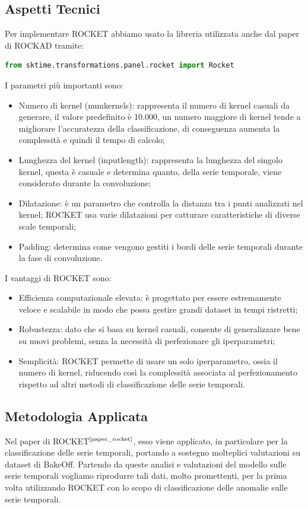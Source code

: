 \subsection{Aspetti Tecnici}
Per implementare ROCKET abbiamo usato la libreria utilizzata anche dal paper di ROCKAD tramite:
\begin{lstlisting}[language=Python]
from sktime.transformations.panel.rocket import Rocket
\end{lstlisting}
I parametri più importanti sono:
\begin{itemize}
    \item Numero di kernel (num\textunderscore kernels): rappresenta il numero di kernel casuali da generare, il valore predefinito è 10.000, un numero maggiore di kernel tende a migliorare l'accuratezza della classificazione, di conseguenza aumenta la complessità e quindi il tempo di calcolo;
    \item Lunghezza del kernel (input\textunderscore length): rappresenta la lunghezza del singolo kernel, questa è casuale e determina quanto, della serie temporale, viene considerato durante la convoluzione;
    \item Dilatazione: è un parametro che controlla la distanza tra i punti analizzati nel kernel; ROCKET usa varie dilatazioni per catturare caratteristiche di diverse scale temporali;
    \item Padding: determina come vengono gestiti i bordi delle serie temporali durante la fase di convoluzione.
\end{itemize} 

I vantaggi di ROCKET sono:
\begin{itemize}
    \item Efficienza computazionale elevata: è progettato per essere estremamente veloce e scalabile in modo che possa gestire grandi dataset in tempi ristretti;
    \item Robustezza: dato che si basa su kernel casuali, consente di generalizzare bene su nuovi problemi, senza la necessità di perfezionare gli iperparametri;
    \item Semplicità: ROCKET permette di usare un solo iperparametro, ossia il numero di kernel, riducendo così la complessità associata al perfezionamento rispetto ad altri metodi di classificazione delle serie temporali.
\end{itemize}
\subsection{Metodologia Applicata}
Nel paper di ROCKET$^{\text{\cite{paper_rocket}}}$, esso viene applicato, in particolare per la classificazione delle serie temporali, portando a sostegno molteplici valutazioni su dataset di BakeOff. Partendo da queste analisi e valutazioni del modello sulle serie temporali vogliamo riprodurre tali dati, molto promettenti, per la prima volta utilizzando ROCKET con lo scopo di classificazione delle anomalie sulle serie temporali.

